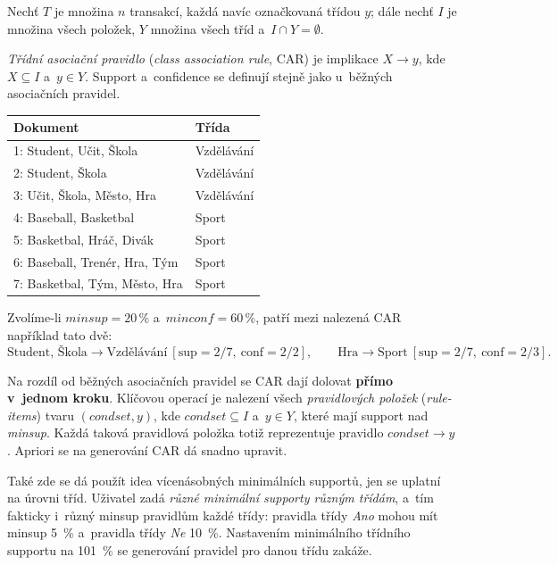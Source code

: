 \documentclass[11pt,a4paper]{article}
\theoremstyle{definition}
\begin{document}
\begin{defbox}
Nechť $T$ je množina $n$ transakcí, každá navíc označkovaná třídou $y$; dále nechť $I$ je
množina všech položek, $Y$ množina všech tříd a~$I\cap Y=\emptyset$.

\emph{Třídní asociační pravidlo} (\emph{class association rule}, CAR) je implikace
$X\to y$, kde $X\subseteq I$ a~$y\in Y$. Support a~confidence se definují stejně jako
u~běžných asociačních pravidel.
\end{defbox}

\begin{defbox}
\begin{center}
\small
\begin{tabular}{@{}ll@{}}
\toprule
Dokument & Třída \\
\midrule
1: Student, Učit, Škola & Vzdělávání \\
2: Student, Škola & Vzdělávání \\
3: Učit, Škola, Město, Hra & Vzdělávání \\
4: Baseball, Basketbal & Sport \\
5: Basketbal, Hráč, Divák & Sport \\
6: Baseball, Trenér, Hra, Tým & Sport \\
7: Basketbal, Tým, Město, Hra & Sport \\
\bottomrule
\end{tabular}
\end{center}
Zvolíme-li $\mathit{minsup}=20\,\%$ a~$\mathit{minconf}=60\,\%$, patří mezi nalezená CAR
například tato dvě:
\[ \text{Student, Škola}\to\text{Vzdělávání}\ [\mathrm{sup}=2/7,\ \mathrm{conf}=2/2],\qquad
   \text{Hra}\to\text{Sport}\ [\mathrm{sup}=2/7,\ \mathrm{conf}=2/3]. \]
\end{defbox}

Na rozdíl od běžných asociačních pravidel se CAR dají dolovat \textbf{přímo v~jednom kroku}.
Klíčovou operací je nalezení všech \emph{pravidlových položek} (\emph{rule-items}) tvaru
$(\mathit{condset},y)$, kde $\mathit{condset}\subseteq I$ a~$y\in Y$, které mají support nad
\emph{minsup}. Každá taková pravidlová položka totiž reprezentuje pravidlo
$\mathit{condset}\to y$. Apriori se na generování CAR dá snadno upravit.

Také zde se dá použít idea vícenásobných minimálních supportů, jen se uplatní na úrovni tříd.
Uživatel zadá \emph{různé minimální supporty různým třídám}, a~tím fakticky i~různý minsup
pravidlům každé třídy: pravidla třídy \emph{Ano} mohou mít minsup 5~\% a~pravidla třídy
\emph{Ne} 10~\%. Nastavením minimálního třídního supportu na 101~\% se generování pravidel
pro danou třídu zakáže.
\end{document}
